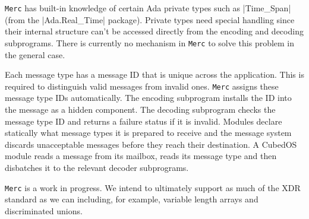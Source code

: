 \texttt{Merc} has built-in knowledge of certain Ada private types such as |Time_Span| (from the
|Ada.Real_Time| package). Private types need special handling since their internal structure
can't be accessed directly from the encoding and decoding subprograms. There is currently no
mechanism in \texttt{Merc} to solve this problem in the general case.

Each message type has a message ID that is unique across the application. This is required to
distinguish valid messages from invalid ones. \texttt{Merc} assigns these message type IDs automatically. The encoding subprogram installs the ID into the message as a
hidden component. The decoding subprogram checks the message type ID and returns a
failure status if it is invalid. Modules declare statically what message types it is prepared to receive and the message system discards unacceptable messages before they reach their destination. A CubedOS module reads a message from its mailbox, reads its message type and then
disbatches it to the relevant decoder subprograms.

\texttt{Merc} is a work in progress. We intend to ultimately support as much of the XDR standard
as we can including, for example, variable length arrays and discriminated unions.
